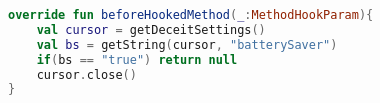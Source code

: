 \begin{lstlisting}[caption={Kotlin code to save battery by returning \texttt{null} based on \texttt{batterySaver} policy defined by user},label={lst:btrySvr},language=Kotlin]
override fun beforeHookedMethod(_:MethodHookParam){
    val cursor = getDeceitSettings() 
    val bs = getString(cursor, "batterySaver")
    if(bs == "true") return null
    cursor.close()
}
\end{lstlisting}